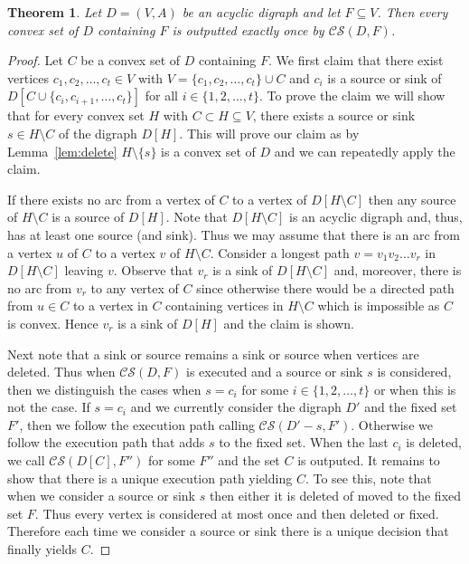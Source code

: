 \documentclass[11pt]{article}
\newcommand{\2}{\vspace{0.2 cm}}
\newtheorem{theorem}{Theorem}[section]
\newcommand\cs{{$\mathcal{CS}$}}
\begin{document}
\begin{theorem}\label{prop:unique}
Let $D=(V,A)$ be an acyclic digraph and let $F\subseteq V$. Then
every convex set of $D$ containing $F$ is outputted exactly once by
{\cs}$(D,F)$.
\end{theorem}
\begin{proof}
Let $C$ be a convex set of $D$ containing $F$. We first claim that
there exist vertices $c_1,c_2,\ldots,c_t \in V$ with
$V=\{c_1,c_2,\ldots,c_t\}\cup C$ and $c_i$ is a source or sink of
$D[C\cup \{c_i,c_{i+1},\ldots,c_t\}]$ for all $i\in \{1,2,\ldots
,t\}$. To prove the claim we will show that for every convex set $H$
with
 $C\subset H\subseteq V$, there exists a source or sink $s\in H\setminus C$ of
the digraph $D[H]$. This will prove our claim as by
Lemma~\ref{lem:delete} $H\setminus \{s\}$ is a convex set of $D$ and we
can repeatedly apply the claim.

If there exists no arc from a vertex of $C$ to  a vertex of
$D[H\setminus C]$ then any source of $H\setminus C$ is a source of
$D[H]$. Note that $D[H\setminus C]$ is an acyclic digraph and, thus,
has at least one source (and sink). Thus we may assume that there is
an arc from a vertex $u$ of $C$ to a vertex $v$ of $H\setminus C$.
Consider a longest path $v=v_1v_2\ldots v_r$ in $D[H\setminus C]$
leaving $v$. Observe that $v_r$ is a sink of $D[H\setminus C]$ and,
moreover, there is no arc from $v_r$ to any vertex of $C$ since
otherwise there would be a directed path from $u\in C$ to a vertex
in $C$ containing vertices in $H\setminus C$ which is impossible as
$C$ is convex. Hence $v_r$ is a sink of $D[H]$ and the claim is
shown.

Next note that a sink or source remains a sink or source when
vertices are deleted. Thus when {\cs}$(D,F)$ is executed and  a
source or sink $s$ is considered, then we distinguish the cases when
$s=c_i$ for some $i\in \{1,2,\ldots ,t\}$ or when this is not the
case. If $s=c_i$  and we currently consider the digraph $D'$ and the
fixed set $F'$, then we follow the execution path calling
{\cs}$(D'-s,F')$. Otherwise we follow the execution path that adds
$s$ to the fixed set. When the last $c_i$ is deleted, we call
{\cs}$(D[C],F'')$  for some $F''$ and the set $C$ is outputed. It
remains to show that there is a unique execution path yielding $C$.
To see this, note that when we consider a source or sink $s$ then
either it is deleted of moved to the fixed set $F$. Thus every
vertex is considered at most once and then deleted or fixed.
Therefore each time we consider a source or sink there is a unique
decision that finally yields $C$.
\end{proof}
\end{document}
